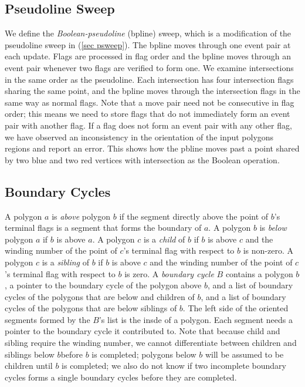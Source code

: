 \documentclass[11pt]{article}
\begin{document}
\subsection{Pseudoline Sweep} \label{sec psweep2}
We define the \textit{Boolean-pseudoline} (bpline) sweep, which is a modification of the pseudoline sweep in (\ref{sec psweep}).
The bpline moves through one event pair at each update.
Flags are processed in flag order and the bpline moves through an event pair whenever two flags are verified to form one.
We examine intersections in the same order as the pseudoline.
Each intersection has four intersection flags sharing the same point, and the bpline moves through the intersection flags in the same way as normal flags.
Note that a move pair need not be consecutive in flag order; this means we need to store flags that do not immediately form an event pair with another flag.
If a flag does not form an event pair with any other flag, we have observed an inconsistency in the orientation of the input polygons regions and report an error.
This shows how the pbline moves past a point shared by two blue and two red vertices with intersection as the Boolean operation.

\subsection{Boundary Cycles} \label{sec bcycle}
A polygon $a$ is \textit{above} polygon $b$ if the segment directly above the point of $b$'s terminal flags is a segment that forms the boundary of $a$.
A polygon $b$ is \textit{below} polygon $a$ if $b$ is above $a$.
A polygon $c$ is a \textit{child} of $b$ if $b$ is above $c$ and the winding number of the point of $c$'s terminal flag with respect to $b$ is non-zero.
A polygon $c$ is a \textit{sibling} of $b$ if $b$ is above $c$ and the winding number of the point of $c$'s terminal flag with respect to $b$ is zero.
A \textit{boundary cycle} $B$ contains a polygon $b$, a pointer to the boundary cycle of the polygon above $b$, and a list of boundary cycles of the polygons that are below and children of $b$, and a list of boundary cycles of the polygons that are below siblings of $b$.
The left side of the oriented segments formed by the $B$'s list is the insde of a polygon.
Each segment needs a pointer to the boundary cycle it contributed to.
Note that because child and sibling require the winding number, we cannot differentiate between children and siblings below $b$before $b$ is completed; polygons below $b$ will be assumed to be children until $b$ is completed; we also do not know if two incomplete boundary cycles forms a single boundary cycles before they are completed.
\end{document}
